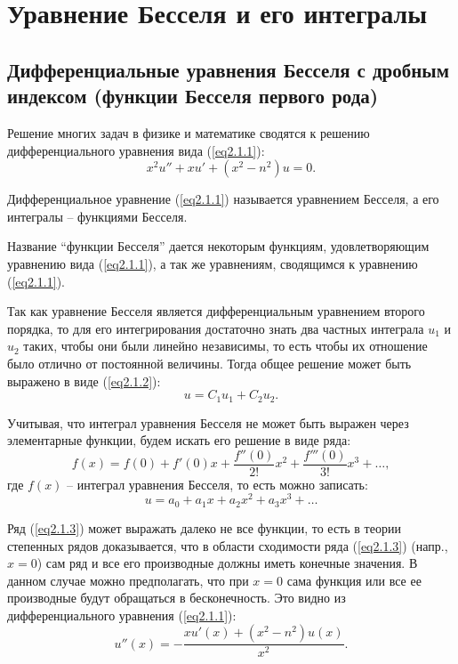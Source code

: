 \section{Уравнение Бесселя и его интегралы}

\subsection{Дифференциальные уравнения Бесселя с дробным индексом (функции Бесселя первого рода)}

    Решение многих задач в физике и математике сводятся к решению дифференциального уравнения вида (\ref{eq2.1.1}):
    \begin{equation}
        x^2u'' + xu' + (x^2-n^2)u = 0.
        \label{eq2.1.1}
    \end{equation}
    
    Дифференциальное уравнение (\ref{eq2.1.1}) называется уравнением Бесселя, а его интегралы -- функциями Бесселя.
    
    Название ``функции Бесселя'' дается некоторым функциям, удовлетворяющим уравнению вида (\ref{eq2.1.1}), а так же уравнениям, сводящимся к уравнению (\ref{eq2.1.1}).
    
    Так как уравнение Бесселя является дифференциальным уравнением второго порядка, то для его интегрирования достаточно знать два частных интеграла \( u_1 \) и \( u_2 \) таких, чтобы они были линейно независимы, то есть чтобы их отношение было отлично от постоянной величины. Тогда общее решение может быть выражено в виде (\ref{eq2.1.2}):
    \begin{equation}
        u = C_1u_1 + C_2u_2.
        \label{eq2.1.2}
    \end{equation}
    
    Учитывая, что интеграл уравнения Бесселя не может быть выражен через элементарные функции, будем искать его решение в виде ряда:
    \[ f(x) = f(0) + f'(0)x + \frac{f''(0)}{2!}x^2 + \frac{f'''(0)}{3!}x^3 + \ldots, \]
    где \( f(x) \) -- интеграл уравнения Бесселя, то есть можно записать:
    \begin{equation}
        u = a_0 + a_1x + a_2x^2 + a_3x^3 + \ldots
        \label{eq2.1.3}
    \end{equation}
    
    Ряд (\ref{eq2.1.3}) может выражать далеко не все функции, то есть в теории степенных рядов доказывается, что в области сходимости ряда (\ref{eq2.1.3}) (напр., \( x = 0 \)) сам ряд и все его производные должны иметь конечные значения. В данном случае можно предполагать, что при \( x = 0 \) сама функция или все ее производные  будут обращаться в бесконечность. Это видно из дифференциального уравнения (\ref{eq2.1.1}):
    \[ u''(x) = -\frac{xu'(x) + (x^2-n^2)u(x)}{x^2}. \]
    
